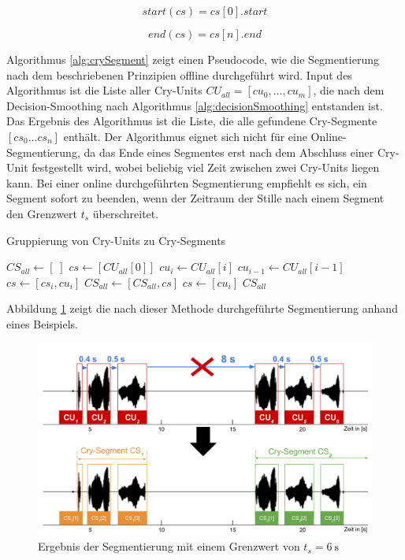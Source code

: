 \begin{equation}
start(cs) = cs[0].start
\label{eq:cry-segment-start}
\end{equation}

\begin{equation}
end(cs) = cs[n].end
\label{eq:cry-segment-end}
\end{equation}

Algorithmus \ref{alg:crySegment} zeigt einen Pseudocode, wie die Segmentierung nach dem beschriebenen Prinzipien offline durchgeführt wird. Input des Algorithmus ist die Liste aller Cry-Units $CU_{all} = [cu_0 ,\ldots, cu_m]$, die nach dem Decision-Smoothing nach Algorithmus \ref{alg:decisionSmoothing} entstanden ist.  Das Ergebnis des Algorithmus ist die Liste, die alle gefundene Cry-Segmente  $[cs_0 \ldots  cs_n]$ enthält. Der Algorithmus eignet sich nicht für eine Online-Segmentierung, da das Ende eines Segmentes erst nach dem Abschluss einer Cry-Unit festgestellt wird, wobei beliebig viel Zeit zwischen zwei Cry-Units liegen kann. Bei einer online durchgeführten Segmentierung empfiehlt es sich, ein Segment sofort zu beenden, wenn der Zeitraum der Stille nach einem Segment den Grenzwert $t_s$ überschreitet.

\begin{algorithm}[H]
	\caption{Gruppierung von Cry-Units zu Cry-Segments}
	\label{alg:crySegment}
	\begin{algorithmic}[1]
		\State $ CS_{all} \gets [\;]$
		\State $ cs \gets [CU_{all}[0]]$
						\State $ cu_i \gets CU_{all}[i]$
						\State $cu_{i-1} \gets CU_{all}[i-1]$
								\State $cs \gets [cs_i , cu_i]$
						\Else
								\State $CS_{all} \gets [CS_{all}, cs]$
								\State $cs \gets [cu_i]$
						\EndIf
				\EndFor
		\Return $CS_{all}$
		
		\EndFunction
		
	\end{algorithmic}
\end{algorithm}
Abbildung \ref{img:segmenting06} zeigt die nach dieser Methode durchgeführte Segmentierung anhand eines Beispiels.

\begin{figure}[h]
	\centering
	\includegraphics[width=1\textwidth]{bilder/segmentierung06.png}
	\caption{Ergebnis der Segmentierung mit einem Grenzwert von $t_s = \SI{6}{\second}$}
	\label{img:segmenting06}
\end{figure}

